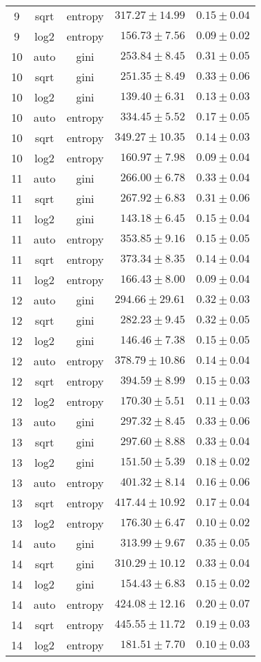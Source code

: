 \begin{tabular}{cccrr}
9 & sqrt & entropy & $317.27 \pm 14.99$ & $0.15 \pm 0.04$\\
9 & log2 & entropy & $156.73 \pm 7.56$ & $0.09 \pm 0.02$\\
10 & auto & gini & $253.84 \pm 8.45$ & $0.31 \pm 0.05$\\
10 & sqrt & gini & $251.35 \pm 8.49$ & $0.33 \pm 0.06$\\
10 & log2 & gini & $139.40 \pm 6.31$ & $0.13 \pm 0.03$\\
10 & auto & entropy & $334.45 \pm 5.52$ & $0.17 \pm 0.05$\\
10 & sqrt & entropy & $349.27 \pm 10.35$ & $0.14 \pm 0.03$\\
10 & log2 & entropy & $160.97 \pm 7.98$ & $0.09 \pm 0.04$\\
11 & auto & gini & $266.00 \pm 6.78$ & $0.33 \pm 0.04$\\
11 & sqrt & gini & $267.92 \pm 6.83$ & $0.31 \pm 0.06$\\
11 & log2 & gini & $143.18 \pm 6.45$ & $0.15 \pm 0.04$\\
11 & auto & entropy & $353.85 \pm 9.16$ & $0.15 \pm 0.05$\\
11 & sqrt & entropy & $373.34 \pm 8.35$ & $0.14 \pm 0.04$\\
11 & log2 & entropy & $166.43 \pm 8.00$ & $0.09 \pm 0.04$\\
12 & auto & gini & $294.66 \pm 29.61$ & $0.32 \pm 0.03$\\
12 & sqrt & gini & $282.23 \pm 9.45$ & $0.32 \pm 0.05$\\
12 & log2 & gini & $146.46 \pm 7.38$ & $0.15 \pm 0.05$\\
12 & auto & entropy & $378.79 \pm 10.86$ & $0.14 \pm 0.04$\\
12 & sqrt & entropy & $394.59 \pm 8.99$ & $0.15 \pm 0.03$\\
12 & log2 & entropy & $170.30 \pm 5.51$ & $0.11 \pm 0.03$\\
13 & auto & gini & $297.32 \pm 8.45$ & $0.33 \pm 0.06$\\
13 & sqrt & gini & $297.60 \pm 8.88$ & $0.33 \pm 0.04$\\
13 & log2 & gini & $151.50 \pm 5.39$ & $0.18 \pm 0.02$\\
13 & auto & entropy & $401.32 \pm 8.14$ & $0.16 \pm 0.06$\\
13 & sqrt & entropy & $417.44 \pm 10.92$ & $0.17 \pm 0.04$\\
13 & log2 & entropy & $176.30 \pm 6.47$ & $0.10 \pm 0.02$\\
14 & auto & gini & $313.99 \pm 9.67$ & $0.35 \pm 0.05$\\
14 & sqrt & gini & $310.29 \pm 10.12$ & $0.33 \pm 0.04$\\
14 & log2 & gini & $154.43 \pm 6.83$ & $0.15 \pm 0.02$\\
14 & auto & entropy & $424.08 \pm 12.16$ & $0.20 \pm 0.07$\\
14 & sqrt & entropy & $445.55 \pm 11.72$ & $0.19 \pm 0.03$\\
14 & log2 & entropy & $181.51 \pm 7.70$ & $0.10 \pm 0.03$\\
\bottomrule
\end{tabular}
